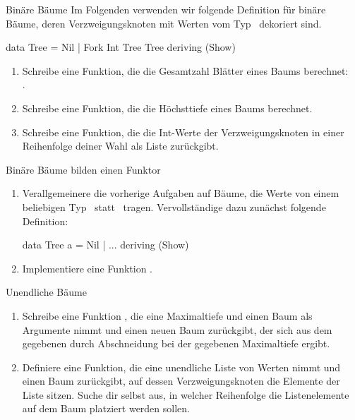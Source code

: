 \documentclass{uebblatt}
\begin{document}
\begin{aufgabe}{Binäre Bäume}
Im Folgenden verwenden wir folgende Definition für binäre Bäume, deren
Verzweigungsknoten mit Werten vom Typ~ dekoriert sind.
\begin{haskellcode}
data Tree = Nil | Fork Int Tree Tree
    deriving (Show)
\end{haskellcode}
\begin{enumerate}
\item Schreibe eine Funktion, die die Gesamtzahl Blätter eines Baums berechnet: \\
.
\item Schreibe eine Funktion, die die Höchsttiefe eines Baums berechnet.
\item Schreibe eine Funktion, die die Int-Werte der Verzweigungsknoten in einer
Reihenfolge deiner Wahl als Liste zurückgibt.
\end{enumerate}
\end{aufgabe}

\begin{aufgabe}{Binäre Bäume bilden einen Funktor}
\begin{enumerate}
\item Verallgemeinere die vorherige Aufgaben auf Bäume, die Werte von
einem beliebigen Typ~ statt~ tragen.
Vervollständige dazu zunächst folgende Definition:
\begin{haskellcode}
data Tree a = Nil | ...
    deriving (Show)
\end{haskellcode}
\item Implementiere eine Funktion .
\end{enumerate}
\end{aufgabe}

\begin{aufgabe}{Unendliche Bäume}
\begin{enumerate}
\item Schreibe eine Funktion , die eine
Maximaltiefe und einen Baum als Argumente nimmt und einen neuen Baum
zurückgibt, der sich aus dem gegebenen durch Abschneidung bei der gegebenen
Maximaltiefe ergibt.
\item Definiere eine Funktion, die eine unendliche Liste von Werten nimmt und
einen Baum zurückgibt, auf dessen Verzweigungsknoten die Elemente der Liste
sitzen. Suche dir selbst aus, in welcher Reihenfolge die Listenelemente auf dem
Baum platziert werden sollen.
\end{enumerate}
\end{aufgabe}
\end{document}

